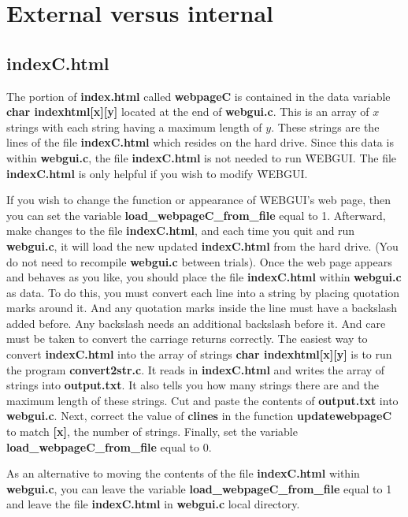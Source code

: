 \section{External versus internal}
\subsection{indexC.html}
\label{sec:7-2}
The portion of \textbf{index.html} called \textbf{webpageC} is contained in the data variable \textbf{char indexhtml[x][y]} 
located at the end of \textbf{webgui.c}. This is an array of $x$ strings with each string having a maximum length of $y$. These
strings are the lines of the file \textbf{indexC.html} which resides on the hard drive. Since this data is within \textbf{webgui.c}, the
file \textbf{indexC.html} is not needed to run \f{WEBGUI}. The file \textbf{indexC.html} is only helpful if you wish to modify
\f{WEBGUI}.

If you wish to change the function or appearance of \f{WEBGUI}'s web page, then you can set the variable \textbf{load\_webpageC\_from\_file}
equal to 1. Afterward, make changes to the file \textbf{indexC.html}, and each time you quit and run \textbf{webgui.c}, it will load 
the new updated \textbf{indexC.html} from the hard drive. (You do not need to recompile \textbf{webgui.c} between trials). Once the web page 
appears and behaves as you like, you should place the file \textbf{indexC.html} within \textbf{webgui.c} as data. To do this,
you must convert each line into a string by placing quotation marks around it. And any quotation marks inside the line must have
a backslash added before. Any backslash needs an additional backslash before it. And care must be taken to convert the carriage
returns correctly. The easiest way to convert \textbf{indexC.html} into the array of strings \textbf{char indexhtml[x][y]} is to run
the program \textbf{convert2str.c}. It reads in \textbf{indexC.html} and writes the array of strings into \textbf{output.txt}. It also tells
you how many strings there are and the maximum length of these strings. Cut and paste the contents of \textbf{output.txt} into
\textbf{webgui.c}. Next, correct the value of \textbf{clines} in the function \textbf{updatewebpageC} to match \textbf{[x]}, the number of
strings. Finally, set the variable \textbf{load\_webpageC\_from\_file} equal to 0.

As an alternative to moving the contents of the file \textbf{indexC.html} within \textbf{webgui.c}, you can leave the variable
\textbf{load\_webpageC\_from\_file} equal to 1 and leave the file \textbf{indexC.html} in \textbf{webgui.c} local directory.

